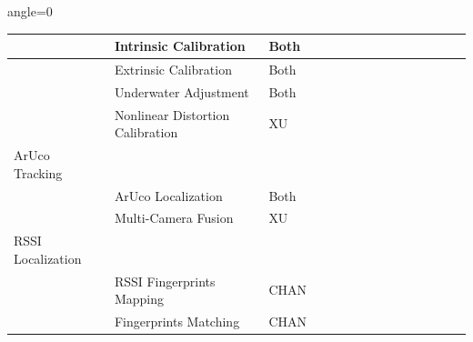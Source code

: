 \documentclass[11pt]{article}
\begin{document}
\begin{landscape}
\begin{table}[H]
\begin{adjustbox}{angle=0}
\begin{tabular}{|p{3.2cm}|p{3.2cm}|p{1.2cm}|c|c|c|c|c|c|c|c|c|c|c|c|}
        \hline
        &Intrinsic Calibration&Both& &\cellcolor{yellow!20}&\cellcolor{yellow!20}&\cellcolor{yellow!20}&\cellcolor{yellow!20}& & & & &\cellcolor{yellow!20}&\cellcolor{yellow!20}& \\
        \hline
        &Extrinsic Calibration&Both& & & & &\cellcolor{yellow!20}&\cellcolor{yellow!20}&\cellcolor{yellow!20}& & & &\cellcolor{yellow!20}&\cellcolor{yellow!20}\\
        \hline
        &Underwater Adjustment&Both& & & & & & &\cellcolor{yellow!20}&\cellcolor{yellow!20}& & & & \\
        \hline
        &Nonlinear Distortion Calibration&XU& & & & & & & & & & & & \\
        \hline
        ArUco Tracking& & & &\cellcolor{blue!20}&\cellcolor{blue!20}&\cellcolor{blue!20}&\cellcolor{blue!20}& & &\cellcolor{blue!20}&\cellcolor{blue!20}&\cellcolor{blue!20}&\cellcolor{blue!20}&\cellcolor{blue!20}\\
        \hline
        &ArUco Localization&Both& &\cellcolor{yellow!20}&\cellcolor{yellow!20}&\cellcolor{yellow!20}&\cellcolor{yellow!20}& & &\cellcolor{yellow!20}&\cellcolor{yellow!20}& & & \\
        \hline
        &Multi-Camera Fusion&XU& & & & & & & & &\cellcolor{yellow!20}&\cellcolor{yellow!20}&\cellcolor{yellow!20}&\cellcolor{yellow!20}\\
        \hline
        RSSI Localization& & & & & & & & & & & & &\cellcolor{blue!20}&\cellcolor{blue!20}\\
        \hline
        &RSSI Fingerprints Mapping&CHAN& & & & & & & & & & &\cellcolor{yellow!20}&\cellcolor{yellow!20}\\
        \hline
        &Fingerprints Matching&CHAN& & & & & & & & & & & & \\
        \hline
        \end{tabular}
        \end{adjustbox}
        \end{table}


\end{landscape}
\end{document}
